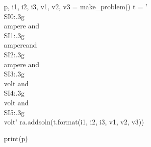 \documentclass[12pt]{exam}
\begin{document}
\begin{questions}
\begin{pycode}
p, i1, i2, i3, v1, v2, v3 = make_problem()
t = '\\SI{{{0:.3g}}}{{\\ampere}} and \\SI{{{1:.3g}}}{{\\ampere}}and \\SI{{{2:.3g}}}{{\\ampere}} and \\SI{{{3:.3g}}}{{\\volt}} and \\SI{{{4:.3g}}}{{\\volt}} and \\SI{{{5:.3g}}}{{\\volt}}'
ra.addsoln(t.format(i1, i2, i3, v1, v2, v3))

print(p)

\end{pycode}

\end{questions}
	
\end{document}

